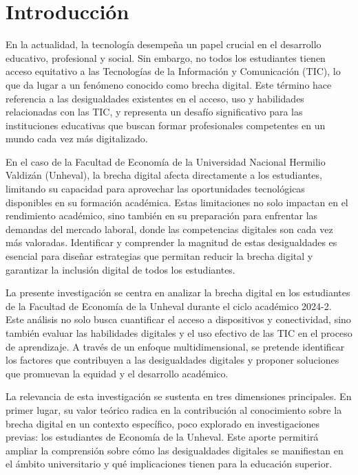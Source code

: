 \documentclass[12pt, a4paper]{article}
\begin{document}
\tableofcontents
\newpage

\section{Introducción}
En la actualidad, la tecnología desempeña un papel crucial en el desarrollo educativo, profesional y social. Sin embargo, no todos los estudiantes tienen acceso equitativo a las Tecnologías de la Información y Comunicación (TIC), lo que da lugar a un fenómeno conocido como brecha digital. Este término hace referencia a las desigualdades existentes en el acceso, uso y habilidades relacionadas con las TIC, y representa un desafío significativo para las instituciones educativas que buscan formar profesionales competentes en un mundo cada vez más digitalizado.

En el caso de la Facultad de Economía de la Universidad Nacional Hermilio Valdizán (Unheval), la brecha digital afecta directamente a los estudiantes, limitando su capacidad para aprovechar las oportunidades tecnológicas disponibles en su formación académica. Estas limitaciones no solo impactan en el rendimiento académico, sino también en su preparación para enfrentar las demandas del mercado laboral, donde las competencias digitales son cada vez más valoradas. Identificar y comprender la magnitud de estas desigualdades es esencial para diseñar estrategias que permitan reducir la brecha digital y garantizar la inclusión digital de todos los estudiantes.

La presente investigación se centra en analizar la brecha digital en los estudiantes de la Facultad de Economía de la Unheval durante el ciclo académico 2024-2. Este análisis no solo busca cuantificar el acceso a dispositivos y conectividad, sino también evaluar las habilidades digitales y el uso efectivo de las TIC en el proceso de aprendizaje. A través de un enfoque multidimensional, se pretende identificar los factores que contribuyen a las desigualdades digitales y proponer soluciones que promuevan la equidad y el desarrollo académico.

La relevancia de esta investigación se sustenta en tres dimensiones principales. En primer lugar, su valor teórico radica en la contribución al conocimiento sobre la brecha digital en un contexto específico, poco explorado en investigaciones previas: los estudiantes de Economía de la Unheval. Este aporte permitirá ampliar la comprensión sobre cómo las desigualdades digitales se manifiestan en el ámbito universitario y qué implicaciones tienen para la educación superior.
\end{document}
